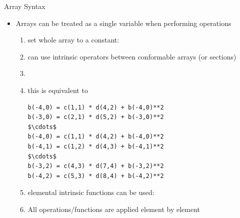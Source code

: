 \documentclass[10pt,t]{beamer}
\begin{document}
\begin{frame}[fragile]{Array Syntax}
  \begin{itemize}
    \item Arrays can be treated as a single variable when performing operations
    \begin{enumerate}
      \item set whole array to a constant: 
      \item can use intrinsic operators between conformable arrays (or sections)
      \item[] {}
      \item[] this is equivalent to
        \begin{lstlisting}[language={[90]Fortran},mathescape]
b(-4,0) = c(1,1) * d(4,2) + b(-4,0)**2 
b(-3,0) = c(2,1) * d(5,2) + b(-3,0)**2 
$\cdots$
b(-4,0) = c(1,1) * d(4,2) + b(-4,0)**2 
b(-4,1) = c(1,2) * d(4,3) + b(-4,1)**2 
$\cdots$
b(-3,2) = c(4,3) * d(7,4) + b(-3,2)**2 
b(-4,2) = c(5,3) * d(8,4) + b(-4,2)**2 
        \end{lstlisting}
      \item elemental intrinsic functions can be used: 
      \item All operations/functions are applied element by element
    \end{enumerate}
  \end{itemize}
\end{frame}
\end{document}
